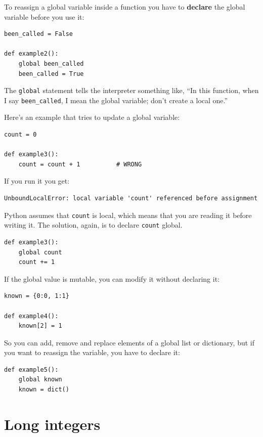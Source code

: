 \documentclass[10pt]{book}
\begin{document}
To reassign a global variable inside a function you have to
{\bf declare} the global variable before you use it:

\begin{verbatim}
been_called = False

def example2():
    global been_called 
    been_called = True
\end{verbatim}
%
The {\tt global} statement tells the interpreter
something like, ``In this function, when I say \verb"been_called", I
mean the global variable; don't create a local one.''

Here's an example that tries to update a global variable:

\begin{verbatim}
count = 0

def example3():
    count = count + 1          # WRONG
\end{verbatim}
%
If you run it you get:

\begin{verbatim}
UnboundLocalError: local variable 'count' referenced before assignment
\end{verbatim}
%
Python assumes that {\tt count} is local, which means
that you are reading it before writing it.  The solution, again,
is to declare {\tt count} global.

\begin{verbatim}
def example3():
    global count
    count += 1
\end{verbatim}
%
If the global value is mutable, you can modify it without
declaring it:

\begin{verbatim}
known = {0:0, 1:1}

def example4():
    known[2] = 1
\end{verbatim}
%
So you can add, remove and replace elements of a global list or
dictionary, but if you want to reassign the variable, you
have to declare it:

\begin{verbatim}
def example5():
    global known
    known = dict()
\end{verbatim}
%

\section{Long integers}
\end{document}
